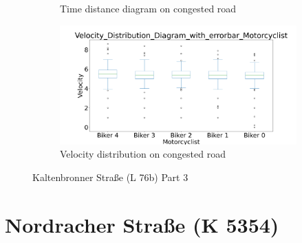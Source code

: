 \begin{figure}[H]
\begin{subfigure}[b]{0.45\textwidth}
        \caption{Time distance diagram on congested road}
    \end{subfigure}
    \hfill
    \begin{subfigure}[b]{0.45\textwidth}
        \centering
        \includegraphics[width=1.0\textwidth]{images/Kaltenbronner/Kaltenbronner_Velocity_Distribution_Diagram_with_errorbar_congested.png}
        \caption{Velocity distribution on congested road}
    \end{subfigure}
    \caption{Kaltenbronner Straße (L 76b) Part 3}
\end{figure}

\section{Nordracher Straße (K 5354)}

